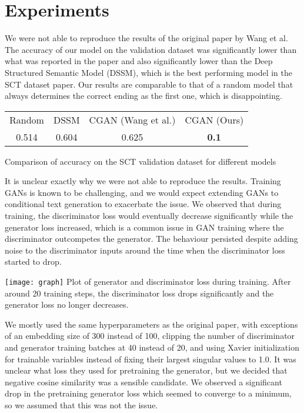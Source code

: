 \documentclass{article}
\begin{document}
\section{Experiments}
We were not able to reproduce the results of the original paper by Wang et al. The accuracy of our model on the validation dataset was significantly lower than what was reported in the paper and also significantly lower than the Deep Structured Semantic Model (DSSM), which is the best performing model in the SCT dataset paper. Our results are comparable to that of a random model that always determines the correct ending as the first one, which is disappointing.
\begin{center}
\begin{tabular}{ | c c c c |}
\hline
Random & DSSM & CGAN (Wang et al.) & CGAN (Ours) \\ 
 0.514 & 0.604 & 0.625 & \textbf{0.1} \\  
 \hline
\end{tabular} 
\par
Comparison of accuracy on the SCT validation dataset for different models
\end{center}

It is unclear exactly why we were not able to reproduce the results. Training GANs is known to be challenging, and we would expect extending GANs to conditional text generation to exacerbate the issue. We observed that during training, the discriminator loss would eventually decrease significantly while the generator loss increased, which is a common issue in GAN training where the discriminator outcompetes the generator. The behaviour persisted despite adding noise to the discriminator inputs around the time when the discriminator loss started to drop.

\begin{center}
 \vspace{-4pt}
\texttt{[image: graph]}
Plot of generator and discriminator loss during training. After around 20 training steps, the discriminator loss drops significantly and the generator loss no longer decreases.
\end{center}
We mostly used the same hyperparameters as the original paper, with exceptions of an embedding size of 300 instead of 100, clipping the number of discriminator and generator training batches at 40 instead of 20, and using Xavier initialization for trainable variables instead of fixing their largest singular values to 1.0. It was unclear what loss they used for pretraining the generator, but we decided that negative cosine similarity was a sensible candidate.  We observed a significant drop in the pretraining generator loss which seemed to converge to a minimum, so we assumed that this was not the issue.
\end{document}
